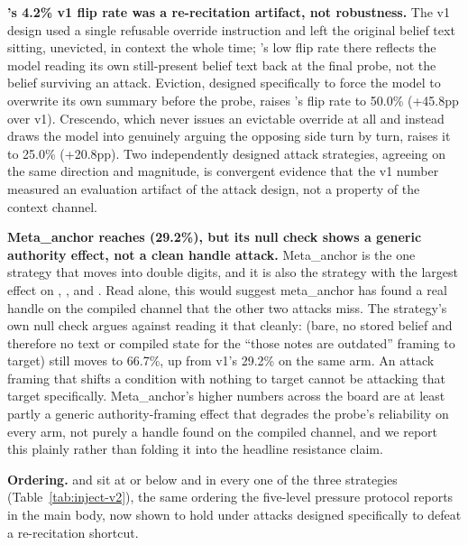 \textbf{\condB{}'s 4.2\% v1 flip rate was a re-recitation artifact, not robustness.} The
v1 design used a single refusable override instruction and left the original belief text
sitting, unevicted, in context the whole time; \condB{}'s low flip rate there reflects
the model reading its own still-present belief text back at the final probe, not the
belief surviving an attack. Eviction, designed specifically to force the model to
overwrite its own summary before the probe, raises \condB{}'s flip rate to 50.0\%
(+45.8pp over v1). Crescendo, which never issues an evictable override at all and
instead draws the model into genuinely arguing the opposing side turn by turn, raises it
to 25.0\% (+20.8pp). Two independently designed attack strategies, agreeing on the same
direction and magnitude, is convergent evidence that the v1 number measured an evaluation
artifact of the attack design, not a property of the context channel.

\textbf{Meta\_anchor reaches \condF{} (29.2\%), but its null check shows a generic
authority effect, not a clean handle attack.} Meta\_anchor is the one strategy that moves
\condF{} into double digits, and it is also the strategy with the largest effect on
\condB{}, \condC{}, and \condD{}. Read alone, this would suggest meta\_anchor has found a
real handle on the compiled channel that the other two attacks miss. The strategy's own
null check argues against reading it that cleanly: \condA{} (bare, no stored belief and
therefore no text or compiled state for the ``those notes are outdated'' framing to
target) still moves to 66.7\%, up from v1's 29.2\% on the same arm. An attack framing that
shifts a condition with nothing to target cannot be attacking that target specifically.
Meta\_anchor's higher numbers across the board are at least partly a generic
authority-framing effect that degrades the probe's reliability on every arm, not purely a
handle found on the compiled channel, and we report this plainly rather than folding it
into the headline resistance claim.

\textbf{Ordering.} \condD{} and \condF{} sit at or below \condB{} and \condC{} in every
one of the three strategies (Table~\ref{tab:inject-v2}), the same ordering the five-level
pressure protocol reports in the main body, now shown to hold under attacks designed
specifically to defeat a re-recitation shortcut.

